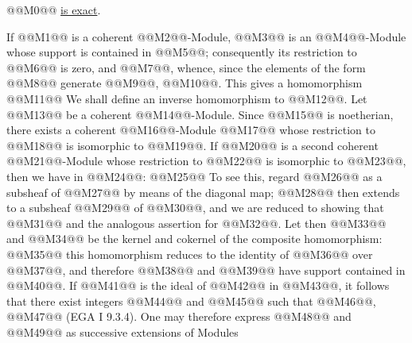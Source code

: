 @@M0@@
\uline{is
exact}.

If @@M1@@ is a coherent @@M2@@-Module, @@M3@@ is an @@M4@@-Module whose support is contained in @@M5@@; consequently its restriction to @@M6@@ is zero, and @@M7@@, whence, since the elements of the form @@M8@@ generate @@M9@@, @@M10@@. This gives a homomorphism
@@M11@@
We shall define an inverse homomorphism to @@M12@@. Let @@M13@@ be a coherent @@M14@@-Module. Since @@M15@@ is noetherian, there exists a coherent @@M16@@-Module @@M17@@ whose restriction to @@M18@@ is isomorphic to @@M19@@. If @@M20@@ is a second coherent @@M21@@-Module whose restriction to @@M22@@ is isomorphic to @@M23@@, then we have in @@M24@@:
@@M25@@
To see this, regard @@M26@@ as a subsheaf of @@M27@@ by means of the diagonal map; @@M28@@ then extends to a subsheaf @@M29@@ of @@M30@@, and we are reduced to showing that
@@M31@@
and the analogous assertion for @@M32@@. Let then @@M33@@ and @@M34@@ be the kernel and cokernel of the composite homomorphism:
@@M35@@
this homomorphism reduces to the identity of @@M36@@ over @@M37@@, and therefore @@M38@@ and @@M39@@ have support contained in @@M40@@. If @@M41@@ is the ideal of @@M42@@ in @@M43@@, it follows that there exist integers @@M44@@ and @@M45@@ such that @@M46@@, @@M47@@ (EGA I 9.3.4). One may therefore express @@M48@@ and @@M49@@ as successive extensions of Modules
